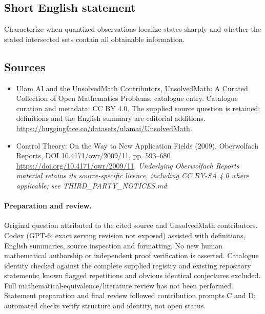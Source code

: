 \documentclass[11pt]{article}
\begin{document}
\subsection{Short English statement}
Characterize when quantized observations localize states sharply and whether the stated intersected sets contain all obtainable information.
\subsection{Sources}
\begin{itemize}
\item[\hypertarget{source:statement:1}{S1}] Ulam AI and the UnsolvedMath Contributors, UnsolvedMath: A Curated Collection of Open Mathematics Problems, catalogue entry. Catalogue curation and metadata: CC BY 4.0. The supplied source question is retained; definitions and the English summary are editorial additions.
\url{https://huggingface.co/datasets/ulamai/UnsolvedMath}.
\item[\hypertarget{source:statement:2}{S2}] Control Theory: On the Way to New Application Fields (2009), Oberwolfach Reports, DOI 10.4171/owr/2009/11, pp. 593--680
\url{https://doi.org/10.4171/owr/2009/11}.
\textit{Underlying Oberwolfach Reports material retains its source-specific licence, including CC BY-SA 4.0 where applicable; see THIRD\_PARTY\_NOTICES.md.}
\end{itemize}
\paragraph{Preparation and review.}
Original question attributed to the cited source and UnsolvedMath contributors. Codex (GPT-6; exact serving revision not exposed) assisted with definitions, English summaries, source inspection and formatting. No new human mathematical authorship or independent proof verification is asserted. Catalogue identity checked against the complete supplied registry and existing repository statements; known flagged repetitions and obvious identical conjectures excluded. Full mathematical-equivalence/literature review has not been performed. Statement preparation and final review followed contribution prompts C and D; automated checks verify structure and identity, not open status.
\label{end:statement}
\end{document}

